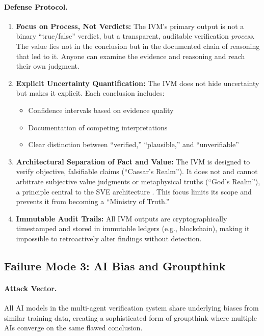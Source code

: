 \documentclass[11pt,a4paper]{article}
\begin{document}
\paragraph{Defense Protocol.}

\begin{enumerate}
    \item \textbf{Focus on Process, Not Verdicts:} The IVM's primary output is not a binary ``true/false'' verdict, but a transparent, auditable verification \textit{process}. The value lies not in the conclusion but in the documented chain of reasoning that led to it. Anyone can examine the evidence and reasoning and reach their own judgment.
    
    \item \textbf{Explicit Uncertainty Quantification:} The IVM does not hide uncertainty but makes it explicit. Each conclusion includes:
    \begin{itemize}
        \item Confidence intervals based on evidence quality
        \item Documentation of competing interpretations
        \item Clear distinction between ``verified,'' ``plausible,'' and ``unverifiable''
    \end{itemize}
    
    \item \textbf{Architectural Separation of Fact and Value:} The IVM is designed to verify objective, falsifiable claims (``Caesar's Realm''). It does not and cannot arbitrate subjective value judgments or metaphysical truths (``God's Realm''), a principle central to the SVE architecture \citep{Kovnatsky2025SVE2}. This focus limits its scope and prevents it from becoming a ``Ministry of Truth.''
    
    \item \textbf{Immutable Audit Trails:} All IVM outputs are cryptographically timestamped and stored in immutable ledgers (e.g., blockchain), making it impossible to retroactively alter findings without detection.
\end{enumerate}

\subsection{Failure Mode 3: AI Bias and Groupthink}

\paragraph{Attack Vector.} All AI models in the multi-agent verification system share underlying biases from similar training data, creating a sophisticated form of groupthink where multiple AIs converge on the same flawed conclusion.
\end{document}
